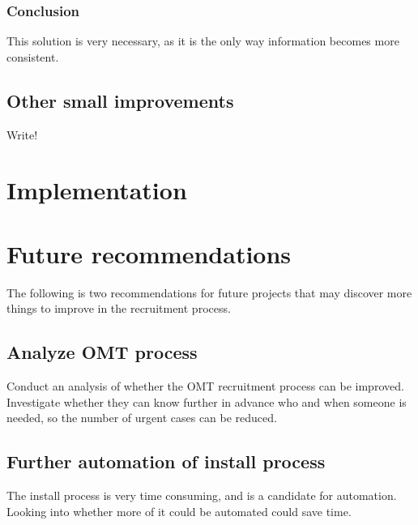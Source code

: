 \subsubsection{Conclusion} 
This solution is very necessary, as it is the only way information becomes more consistent.

\subsection{Other small improvements}

Write! 


\section{Implementation}

\section{Future recommendations}
The following is two recommendations for future projects that may discover more things to improve in the recruitment process.

\subsection{Analyze OMT process}
Conduct an analysis of whether the OMT recruitment process can be improved.
Investigate whether they can know further in advance who and when someone is needed, so the number of urgent cases can be reduced.

\subsection{Further automation of install process}
The install process is very time consuming, and is a candidate for automation.
Looking into whether more of it could be automated could save time.